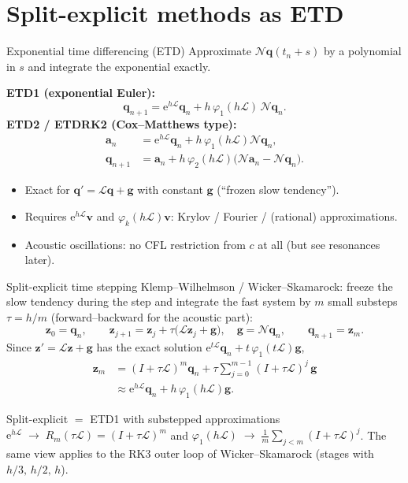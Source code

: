 \documentclass[aspectratio=169,10pt]{beamer}
\newcommand{\ee}{\mathrm{e}}
\newcommand{\bq}{\mathbf{q}}
\newcommand{\LL}{\mathcal{L}}   %
\newcommand{\NN}{\mathcal{N}}   %
\newcommand{\ph}{\varphi}
\begin{document}
\section{Split-explicit methods as ETD}

\begin{frame}{Exponential time differencing (ETD)}
  Approximate $\NN\bq(t_n+s)$ by a polynomial in $s$ and integrate the exponential exactly.

  \medskip
  \textbf{ETD1 (exponential Euler):}
  \[
    \bq_{n+1}=\ee^{h\LL}\bq_n+h\,\ph_1(h\LL)\,\NN\bq_n .
  \]
  \textbf{ETD2 / ETDRK2 (Cox--Matthews type):}
  \begin{align*}
    \mathbf{a}_n &= \ee^{h\LL}\bq_n+h\,\ph_1(h\LL)\NN\bq_n,\\
    \bq_{n+1} &= \mathbf{a}_n + h\,\ph_2(h\LL)\big(\NN\mathbf{a}_n-\NN\bq_n\big).
  \end{align*}
  \begin{itemize}
    \item Exact for $\bq'=\LL\bq+\mathbf{g}$ with constant $\mathbf{g}$ (``frozen slow tendency'').
    \item Requires $\ee^{h\LL}\mathbf{v}$ and $\ph_k(h\LL)\mathbf{v}$: Krylov / Fourier / (rational) approximations.
    \item Acoustic oscillations: no CFL restriction from $c$ at all (but see resonances later).
  \end{itemize}
\end{frame}

\begin{frame}{Split-explicit time stepping}
  Klemp--Wilhelmson / Wicker--Skamarock: freeze the slow tendency during the step and integrate the fast
  system by $m$ small substeps $\tau=h/m$ (forward--backward for the acoustic part):
  \[
    \mathbf{z}_0=\bq_n,\qquad
    \mathbf{z}_{j+1}=\mathbf{z}_j+\tau\big(\LL\mathbf{z}_j+\mathbf{g}\big),\quad \mathbf{g}=\NN\bq_n,
    \qquad \bq_{n+1}=\mathbf{z}_m .
  \]
  Since $\mathbf{z}'=\LL\mathbf{z}+\mathbf{g}$ has the exact solution $\ee^{t\LL}\bq_n+t\,\ph_1(t\LL)\mathbf{g}$,
  \begin{align*}
    \mathbf{z}_m &= (I+\tau\LL)^m\bq_n+\tau\sum_{j=0}^{m-1}(I+\tau\LL)^j\,\mathbf{g}\\
                 &\approx \ee^{h\LL}\bq_n + h\,\ph_1(h\LL)\mathbf{g}.
  \end{align*}
  \begin{block}{Split-explicit $=$ ETD1 with substepped approximations}
    $\ee^{h\LL}\;\to\;R_m(\tau\LL)=(I+\tau\LL)^m$ and $\ph_1(h\LL)\;\to\;\frac1m\sum_{j<m}(I+\tau\LL)^j$.
    The same view applies to the RK3 outer loop of Wicker--Skamarock (stages with $h/3,\,h/2,\,h$).
  \end{block}
\end{frame}
\end{document}
